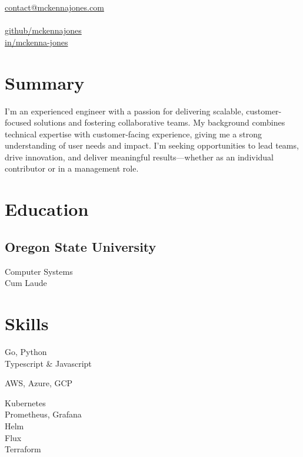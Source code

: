 \documentclass[]{hieudo-build}
\begin{document}
%
%
{
	\faEnvelope \href{mailto:contact@mckennajones.com}{ contact@mckennajones.com}\\
	 \\
	\faGithub \href{https://github.com/mckennajones}{   github/mckennajones}\\
	\faLinkedin \href{https://www.linkedin.com/in/mckenna-jones}{   in/mckenna-jones}}
    
%
%
\begin{minipage}[t]{0.25\textwidth} 

\section{Summary} 
I’m an experienced engineer with a passion for delivering scalable, customer-focused solutions and fostering collaborative teams. My background combines technical expertise with customer-facing experience, giving me a strong understanding of user needs and impact. I’m seeking opportunities to lead teams, drive innovation, and deliver meaningful results—whether as an individual contributor or in a management role.\vspace{15pt}
\section{Education} 

\subsection{Oregon State University}
Computer Systems \\
Cum Laude\\

\vspace{15pt}
\section{Skills}
Go, Python\\
Typescript \& Javascript
\sectionsep

AWS, Azure, GCP
\sectionsep

Kubernetes\\
Prometheus, Grafana\\
Helm\\
Flux\\
Terraform 
\sectionsep

%
%
\end{minipage} 
\end{document}
